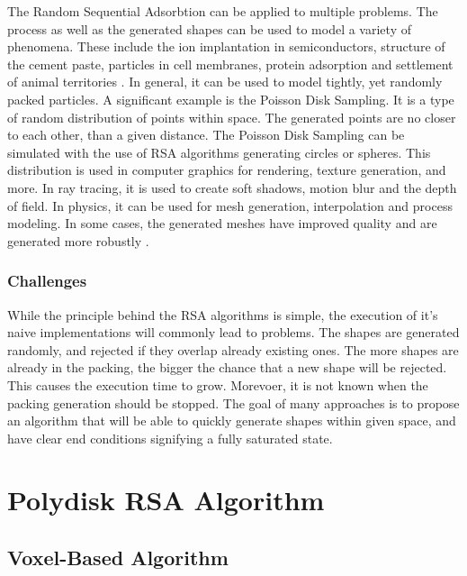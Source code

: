 \documentclass[12pt, oneside]{report}
\begin{document}
The Random Sequential Adsorbtion can be applied to multiple problems. The process as well as the generated shapes can be used to model a variety of phenomena. These include the ion implantation in semiconductors, structure of the cement paste, particles in cell membranes, protein adsorption and settlement of animal territories \cite{zhang}. In general, it can be used to model tightly, yet randomly packed particles.\newline \newline
A significant example is the Poisson Disk Sampling. It is a type of random distribution of points within space. The generated points are no closer to each other, than a given distance. The Poisson Disk Sampling can be simulated with the use of RSA algorithms generating circles or spheres. \newline
This distribution is used in computer graphics for rendering, texture generation, and more. In ray tracing, it is used to create soft shadows, motion blur and the depth of field. In physics, it can be used for mesh generation, interpolation and process modeling. In some cases, the generated meshes have improved quality and are generated more robustly \cite{ebeida}.

\subsection {Challenges}

While the principle behind the RSA algorithms is simple, the execution of it's naive implementations will commonly lead to problems. The shapes are generated randomly, and rejected if they overlap already existing ones. The more shapes are already in the packing, the bigger the chance that a new shape will be rejected. This causes the execution time to grow. Morevoer, it is not known when the packing generation should be stopped. The goal of many approaches is to propose an algorithm that will be able to quickly generate shapes within given space, and have clear end conditions signifying a fully saturated state.



\chapter{Polydisk RSA Algorithm}

\section {Voxel-Based Algorithm}
\end{document}
